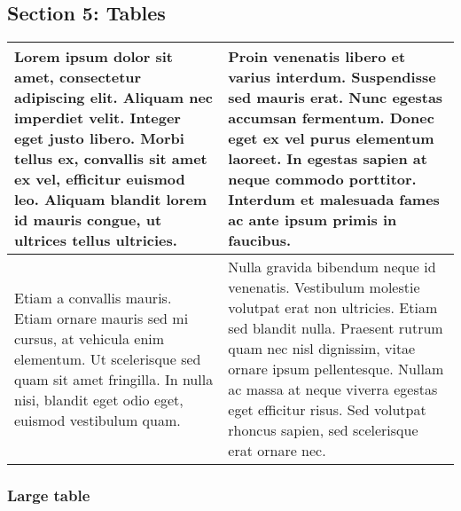 \documentclass{article}
\begin{document}
\subsection*{Section 5: Tables}
\begin{tabularx}{\textwidth}{|X|X|}
\hline

Lorem ipsum dolor sit amet, consectetur adipiscing elit. Aliquam nec imperdiet velit. Integer eget justo libero. Morbi tellus ex, convallis sit amet ex vel, efficitur euismod leo. Aliquam blandit lorem id mauris congue, ut ultrices tellus ultricies. 
 &
Proin venenatis libero et varius interdum. Suspendisse sed mauris erat. Nunc egestas accumsan fermentum. Donec eget ex vel purus elementum laoreet. In egestas sapien at neque commodo porttitor. Interdum et malesuada fames ac ante ipsum primis in faucibus. 
 \\\hline
Etiam a convallis mauris. Etiam ornare mauris sed mi cursus, at vehicula enim elementum. Ut scelerisque sed quam sit amet fringilla. In nulla nisi, blandit eget odio eget, euismod vestibulum quam. 
 &
Nulla gravida bibendum neque id venenatis. Vestibulum molestie volutpat erat non ultricies. Etiam sed blandit nulla. Praesent rutrum quam nec nisl dignissim, vitae ornare ipsum pellentesque. Nullam ac massa at neque viverra egestas eget efficitur risus. Sed volutpat rhoncus sapien, sed scelerisque erat ornare nec. 
 \\\hline
\end{tabularx}
\subsubsection*{Large table}
\end{document}
